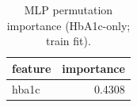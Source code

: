 \begin{table}[H]
\begin{center}
\begin{tabular}{lr}
\toprule
feature & importance \\
\midrule
hba1c & 0.4308 \\
\bottomrule
\end{tabular}
\end{center}
\vspace{-5pt}
\caption{MLP permutation importance (HbA1c-only; train fit).}
\label{tab:mlp_perm_importance_hba1c_only}
\end{table}
